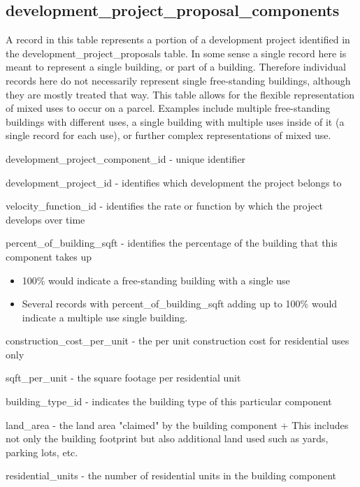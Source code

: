 \subsection{development\_project\_proposal\_components} 

A record in this table represents a portion of a development project identified in the development\_project\_proposals table. In some sense a single record here is meant to represent a single building, or part of a building. Therefore individual records here do not necessarily represent single free-standing buildings, although they are mostly treated that way. This table allows for the flexible representation of mixed uses to occur on a parcel. Examples include multiple free-standing buildings with different uses, a single building with multiple uses inside of it (a single record for each use), or further complex representations of mixed use.

\begin{description}
\item development\_project\_component\_id - unique identifier
\item development\_project\_id - identifies which development the project belongs to
\item velocity\_function\_id - identifies the rate or function by which the project develops over time
\item percent\_of\_building\_sqft - identifies the percentage of the building that this component takes up
  \begin{itemize}
  \item 100\% would indicate a free-standing building with a single use
  \item Several records with percent\_of\_building\_sqft adding up to 100\% would indicate a multiple use single building. 
  \end{itemize}
\item construction\_cost\_per\_unit - the per unit construction cost for residential uses only
\item sqft\_per\_unit - the square footage per residential unit
\item building\_type\_id - indicates the building type of this particular component
\item land\_area - the land area "claimed" by the building component
                + This includes not only the building footprint but also additional land used such as yards, parking lots, etc. 
\item residential\_units - the number of residential units in the building component 
\end{description}

